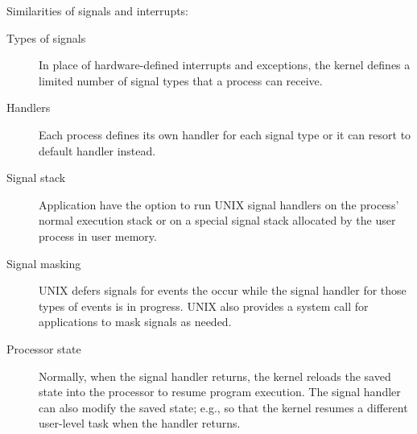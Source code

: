 Similarities of signals and interrupts:
\begin{description}
    \item[Types of signals] In place of hardware-defined interrupts and exceptions, the kernel defines a limited number of signal types that a process can receive.
    \item[Handlers] Each process defines its own handler for each signal type or it can resort to default handler instead.
    \item[Signal stack] Application have the option to run UNIX signal handlers on the process' normal execution stack or on a special signal stack allocated by the user process in user memory. 
    \item[Signal masking] UNIX defers signals for events the occur while the signal handler for those types of events is in progress. UNIX also provides a system call for applications to mask signals as needed.
    \item[Processor state] Normally, when the signal handler returns, the kernel reloads the saved state into the processor to resume program execution. The signal handler can also modify the saved state; e.g., so that the kernel resumes a different user-level task when the handler returns.     
\end{description}
